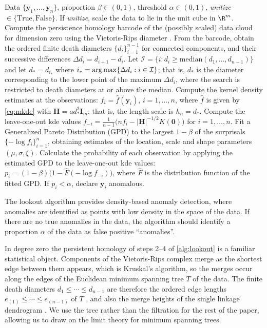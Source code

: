 \begin{algorithm}
  \caption{Lookout algorithm}\label{alg:lookout}
  \begin{algorithmic}[1]
    \Require Data $\{\bm{y}_1, \dots, \bm{y}_n\}$, proportion $\beta \in (0,1)$, threshold $\alpha \in (0,1)$, \emph{unitize} $\in \{\text{True}, \text{False}\}$.
    \State If \textit{unitize}, scale the data to lie in the unit cube in $\R^m$.
    \State Compute the persistence homology barcode of the (possibly scaled) data cloud for dimension zero using the Vietoris-Rips diameter \citep{ghrist2008barcodes}.
    \State From the barcode, obtain the ordered finite death diameters $\{d_i\}_{i = 1}^{n-1}$ for connected components, and their successive differences $\Delta d_i = d_{i+1} - d_i$.
    \State Let $\mathcal{I} = \{i : d_i \geq \text{median}(d_1,\dots,d_{n-1})\}$ and let $d_* = d_{i_*}$ where $i_* = \text{arg\! max} \{\Delta d_i : i \in \mathcal{I}\}$; that is, $d_*$ is the diameter corresponding to the lower point of the maximum $\Delta d_i$, where the search is restricted to death diameters at or above the median.
    \State Compute the kernel density estimates at the observations: $f_i = \hat{f}(\bm{y}_i)$, $i=1,\dots,n$, where $\hat{f}$ is given by \eqref{eq:mkde} with $\bm{H} = ad_*^2\bm{I}_m$; that is, the length scale is $h_n = d_*$.
    \State Compute the leave-one-out kde values $f_{-i} = \frac{1}{n-1} \big( n f_i - |\bm{H}|^{-1/2} K(\bm{0}) \big)$ for $i=1,\dots,n$.
    \State Fit a Generalized Pareto Distribution (GPD) to the largest $1-\beta$ of the surprisals $\{-\log f_i\}_{i=1}^n$, obtaining estimates of the location, scale and shape parameters $(\mu, \sigma, \xi)$.
    \State Calculate the probability of each observation by applying the estimated GPD to the leave-one-out kde values: $p_i = (1-\beta)\big(1 - \hat{F}(-\log f_{-i})\big)$, where $\hat{F}$ is the distribution function of the fitted GPD.
    \State If $p_i < \alpha$, declare $\bm{y}_i$ anomalous.
  \end{algorithmic}
\end{algorithm}

The lookout algorithm provides density-based anomaly detection, where anomalies are identified as points with low density in the space of the data. If there are no true anomalies in the data, the algorithm should identify a proportion $\alpha$ of the data as false positive ``anomalies''.

In degree zero the persistent homology of steps 2--4 of \cref{alg:lookout} is a familiar statistical object. Components of the Vietoris-Rips complex merge as the shortest edge between them appears, which is Kruskal's algorithm, so the merges occur along the edges of the Euclidean minimum spanning tree $T$ of the data. The finite death diameters $d_1 \le \cdots \le d_{n-1}$ are therefore the ordered edge lengths $e_{(1)} \le \cdots \le e_{(n-1)}$ of $T$ \citep[Remark 1]{AdamsPHdim}, and also the merge heights of the single linkage dendrogram \citep{Gower1969}. We use the tree rather than the filtration for the rest of the paper, allowing us to draw on the limit theory for minimum spanning trees.


